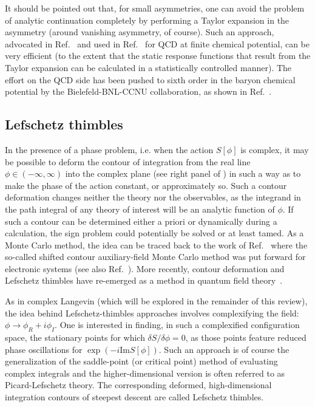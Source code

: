 \documentclass[../main.tex]{subfiles}
\begin{document}
It should be pointed out that, for small asymmetries, one can avoid the problem of analytic continuation completely by performing a Taylor expansion in
the asymmetry (around vanishing asymmetry, of course). Such an approach, advocated in Ref.~\cite{deForcrand:2007rq} and used in
Ref.~\cite{Endrodi:2011gv} for QCD at finite chemical potential, can be very efficient (to the extent that the static response functions that result from the
Taylor expansion can be calculated in a statistically controlled manner). The effort on the QCD side has been pushed to sixth order in the baryon chemical potential
by the Bielefeld-BNL-CCNU collaboration, as shown in Ref.~\cite{Sharma:2017jwb}.
\subsection{Lefschetz thimbles~\label{sect:Thimbles}}

In the presence of a phase problem, i.e. when the action $S[\phi]$ is complex, it may be possible to deform the contour of
integration from the real line $\phi \in (-\infty,\infty)$ into the complex plane (see right panel of )
in such a way as to make the phase of the action constant, or approximately so. Such a contour deformation changes neither the theory nor the observables,
as the integrand in the path integral of any theory of interest will be an analytic function of $\phi$.
If such a contour can be determined either a priori or dynamically during a calculation, the sign problem
could potentially be solved or at least tamed. As a Monte Carlo method, the idea can be traced back to the work of Ref.~\cite{ROM1997382} where the
so-called shifted contour auxiliary-field Monte Carlo method was put forward for electronic systems (see also Ref.~\cite{Witten:2010cx, Witten:2010zr}).
More recently, contour deformation and
Lefschetz thimbles have re-emerged as a method in quantum field
theory~\cite{PhysRevD.86.074506, PhysRevD.88.051501, PhysRevD.88.051502, Fujii:2013sra, PhysRevD.89.114505,Kanazawa2015,PhysRevD.91.101701, Fukushima:2015qza, Hayata:2015lzj, Tanizaki:2016cou, PhysRevD.95.014502, Nishimura:2017eiu, Ulybyshev:2017hbs, Bluecher:2018sgj,PhysRevD.98.034506,Ulybyshev2019fte, Ulybyshev2019hfm, Fukuma2019wbv}.

As in complex Langevin (which will be explored in the remainder of this review), the idea behind Lefschetz-thimbles approaches involves complexifying the field: $\phi \to \phi_R + i \phi_I$. One is interested in finding,
in such a complexified configuration space, the stationary points for which $\delta S/\delta \phi = 0$, as those points feature reduced phase oscillations for
$\exp\left (-i \textrm{Im} S[\phi]\right )$. Such an approach is of course the generalization of the saddle-point (or critical point) method of evaluating
complex integrals and the higher-dimensional version is often referred to as Picard-Lefschetz theory. The corresponding deformed,
high-dimensional integration contours of steepest descent are called Lefschetz thimbles.
\end{document}
